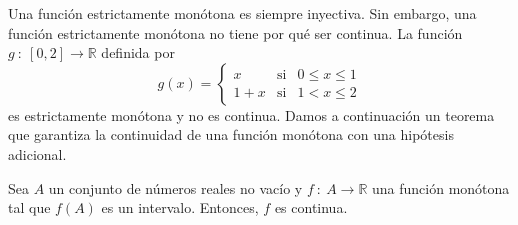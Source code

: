 Una función estrictamente monótona es siempre inyectiva. Sin embargo, una función estrictamente monótona no tiene por qué ser continua. La función $g ~:~ [0,2] \longrightarrow \mathbb{R}$ definida por
\begin{equation*}
    g(x) =
    \left\{ \begin{array}{ccl}
            x & \text{si} &0 \leq x \leq 1 \\
            1+x &\text{si} & 1 < x \leq 2
        \end{array}
    \right.
\end{equation*}
es estrictamente monótona y no es continua. Damos a continuación un teorema que garantiza la continuidad de una función monótona con una hipótesis adicional.
\begin{teo}
    Sea $A$ un conjunto de números reales no vacío y $f ~:~ A \longrightarrow \mathbb{R}$ una función monótona tal que $f(A)$ es un intervalo. Entonces, $f$ es continua.
\end{teo}
